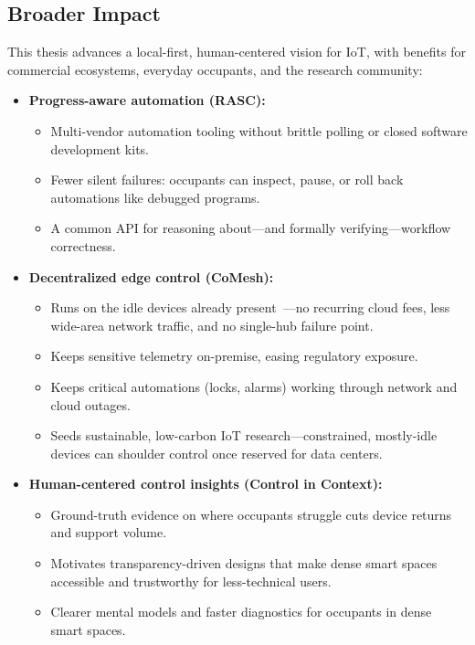 \subsection{Broader Impact}
\label{intro:sec:impact}

This thesis advances a local-first, human-centered vision for IoT, with benefits for commercial ecosystems, everyday occupants, and the research community:

\begin{itemize}
    \item \textbf{Progress-aware automation (RASC):}
    \begin{itemize}
        \item Multi-vendor automation tooling without brittle polling or closed software development kits.
        \item Fewer silent failures: occupants can inspect, pause, or roll back automations like debugged programs.
        \item A common API for reasoning about---and formally verifying---workflow correctness.
    \end{itemize}

    \item \textbf{Decentralized edge control (CoMesh):}
    \begin{itemize}
        \item Runs on the idle devices already present~\cite{hyperedge}---no recurring cloud fees, less wide-area network traffic, and no single-hub failure point.
        \item Keeps sensitive telemetry on-premise, easing regulatory exposure.
        \item Keeps critical automations (locks, alarms) working through network and cloud outages.
        \item Seeds sustainable, low-carbon IoT research---constrained, mostly-idle devices can shoulder control once reserved for data centers.
    \end{itemize}

    \item \textbf{Human-centered control insights (Control in Context):}
    \begin{itemize}
        \item Ground-truth evidence on where occupants struggle cuts device returns and support volume.
        \item Motivates transparency-driven designs that make dense smart spaces accessible and trustworthy for less-technical users.
        \item Clearer mental models and faster diagnostics for occupants in dense smart spaces.
    \end{itemize}
\end{itemize}

